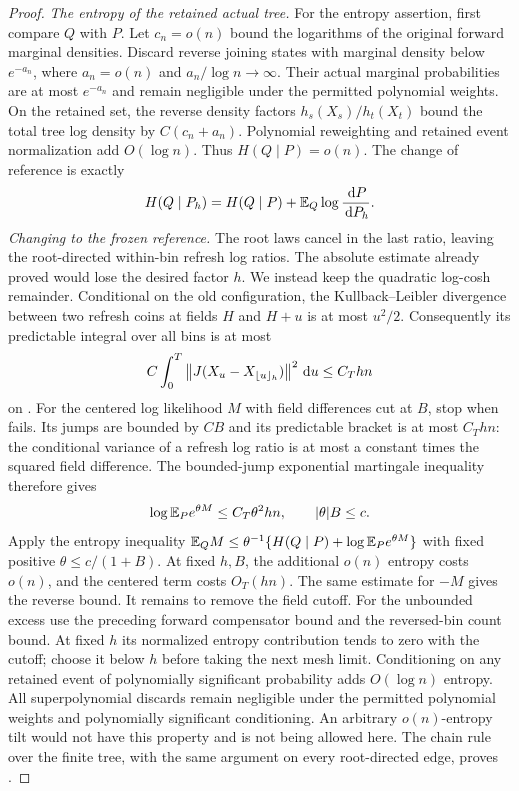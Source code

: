 \begin{proof}
\emph{The entropy of the retained actual tree.}
For the entropy assertion, first compare $Q$ with $P$.  Let
$c_n=o(n)$ bound the logarithms of the original forward marginal
densities.  Discard reverse joining states with marginal density below
$e^{-a_n}$, where $a_n=o(n)$ and $a_n/\log n\to\infty$.
Their actual marginal probabilities are at most $e^{-a_n}$ and remain
negligible under the permitted polynomial weights.  On the retained
set, the reverse density factors $h_s(X_s)/h_t(X_t)$ bound the total
tree log density by $C(c_n+a_n)$.  Polynomial reweighting and retained
event normalization add $O(\log n)$.  Thus $H(Q\mid P)=o(n)$.
The change of reference is exactly
\begin{equation}
 H(Q\mid P_h)=H(Q\mid P)
                   +\mathbb E_Q\log\frac{\,\mathrm d P}{\,\mathrm d P_h}.
 \label{eq:path-entropy-reference}
\end{equation}
\emph{Changing to the frozen reference.}
The root laws cancel in the last ratio, leaving the root-directed
within-bin refresh log ratios.  The absolute estimate already proved
would lose the desired factor $h$.  We instead keep the quadratic
log-cosh remainder.  Conditional on the old
configuration, the Kullback--Leibler divergence
between two refresh coins at fields $H$ and $H+u$ is at most $u^2/2$.
Consequently its predictable integral over all bins is at most
\[
 C\int_0^T\left\lVert J(X_u-X_{\lfloor u\rfloor_h})\right\rVert^2\,\mathrm d u
 \le C_Thn
\]
on .  For the centered log likelihood $M$ with field differences cut at $B$,
stop when  fails.  Its jumps are bounded by
$CB$ and its predictable bracket is at most $C_T hn$: the conditional
variance of a refresh log ratio is at most a constant times the squared
field difference.  The bounded-jump exponential martingale inequality
therefore gives
\[
 \log\mathbb E_P e^{\theta M}\le C_T\theta^2 hn,
 \qquad |\theta|B\le c.
\]
Apply the entropy inequality
$\mathbb E_QM\le\theta^{-1}\{H(Q\mid P)+\log\mathbb E_Pe^{\theta M}\}$
with fixed positive $\theta\le c/(1+B)$.  At fixed $h,B$, the
additional $o(n)$ entropy costs $o(n)$, and the centered term costs
$O_T(hn)$.  The same estimate for $-M$ gives the reverse bound.
It remains to remove the field cutoff.  For the unbounded excess use
the preceding forward compensator bound and the reversed-bin count bound.
At fixed $h$ its normalized entropy
contribution tends to zero with the cutoff; choose it below $h$ before
taking the next mesh limit.  Conditioning on any retained event of
polynomially significant probability adds $O(\log n)$ entropy.
All superpolynomial discards remain negligible under the permitted
polynomial weights and polynomially significant conditioning.  An
arbitrary $o(n)$-entropy tilt would not have this property and is not
being allowed here.  The chain rule over the finite tree, with the same
argument on every root-directed edge, proves .
\end{proof}

